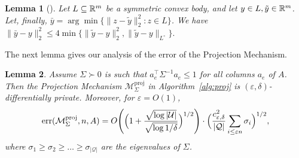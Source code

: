 \documentclass{article}
\newtheorem{lemma}{Lemma}[theorem]
\newcommand{\alg}{\mathcal{M}}
\newcommand{\eps}{\varepsilon}
\newcommand{\univ}{U}
\DeclareMathOperator{\err}{err}
\newcommand{\tra}{\intercal}
\renewcommand{\univ}{\mathcal{U}}
\newcommand{\quer}{\mathcal{Q}}
\begin{document}
\begin{lemma}[\cite{NTZ,conjunctions}]\label{lm:lse}
  Let $L \subseteq {\mathbb{R}}^m$ be a symmetric convex body, and let $y\in L,
  \tilde{y}\in {\mathbb{R}}^m$. Let, finally, $\bar{y} =\arg\min\{\|z -
  \tilde{y}\|_2^2: z \in L\}$. We have $\|\bar{y} - y\|_2^2 \leq
  4\min\{\|\tilde{y} - y\|_2^2, \|\tilde{y} - y\|_{L^\circ}\}.  $
\end{lemma}

The next lemma gives our analysis of the error of the Projection
Mechanism.

\begin{lemma}\label{lm:proj-err}
  Assume $\Sigma \succ 0$ is such that $a_e^\tra \Sigma^{-1} a_e \leq
  1$ for all columns $a_e$ of $A$. Then the Projection Mechanism
  $\alg_\Sigma^{\text{proj}}$ in Algorithm~\ref{alg:proj} is $(\eps,
  \delta)$-differentially private. Moreover, for $\eps = O(1)$,
  \[
  \err(\alg_\Sigma^{\text{proj}}, n, A) =O\Biggl(\Bigl(1+\frac{\sqrt{\log |\univ|}}{\sqrt{\log
      1/\delta}}\Bigr)^{1/2}\Biggr)\cdot
  \Bigl(\frac{c^2_{\eps, \delta}}{|\quer|}\sum_{i \leq \eps n}{\sigma_i}\Bigr)^{1/2},
  \] where $\sigma_1 \ge \sigma_2\ge
  \ldots \ge \sigma_{|\quer|}$ are the eigenvalues of $\Sigma$.
\end{lemma}
\end{document}
